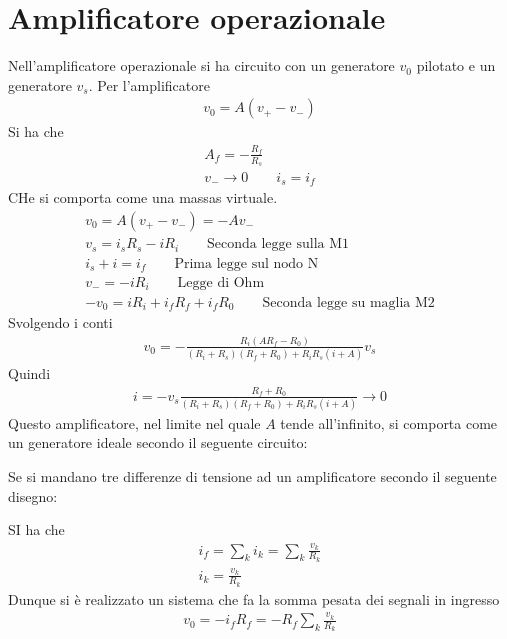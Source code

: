 \documentclass[a4paper, oneside]{article}
\begin{document}
\section{Amplificatore operazionale}
Nell'amplificatore operazionale si ha  circuito con 
un generatore $v_0$ pilotato e un generatore $v_s$. 
Per l'amplificatore 
\begin{gather*}
    v_0 = A(v_+ - v_-)
\end{gather*}
Si ha che
\begin{gather*}
    A_f = - \frac{R_f}{R_s} \\
    v_- \to 0 \qquad i_s = i_f
\end{gather*}
CHe si comporta come una massas virtuale. 
\begin{gather*}
    v_0 = A(v_+ - v_-) = -Av_- \\
    v_s = i_s R_s - iR_i \qquad \text{Seconda legge sulla M1}\\
    i_s + i = i_f \qquad \text{Prima legge sul nodo N}\\
    v_- = -iR_i \qquad \text{Legge di Ohm}\\
    -v_0 = iR_i + i_fR_f + i_fR_0 \qquad \text{Seconda legge su maglia M2}
\end{gather*}
Svolgendo i conti 
\begin{gather*}
    v_0 = - \frac{R_i(AR_f - R_0)}{(R_i + R_s)(R_f + R_0) + R_iR_s(i + A)}v_s
\end{gather*}
Quindi 
\begin{gather*}
    i = - v_s \frac{R_f + R_0}{(R_i + R_s) (R_f + R_0) + R_iR_s(i + A)} \to 0
\end{gather*}
Questo amplificatore, nel limite nel quale $A$ tende all'infinito, si comporta come un generatore
ideale secondo il seguente circuito:

Se si mandano tre differenze di tensione ad un amplificatore secondo il seguente disegno:

SI ha che
\begin{gather*}
    i_f = \sum_k i_k = \sum_k \frac{v_k}{R_k} \\
    i_k  =\frac{v_k}{R_k} 
\end{gather*}
Dunque si è realizzato un sistema che fa la somma pesata dei segnali 
in ingresso 
\begin{gather*}
    v_0 = -i_fR_f = - R_f \sum_k \frac{v_k}{R_k}
\end{gather*}
\end{document}
